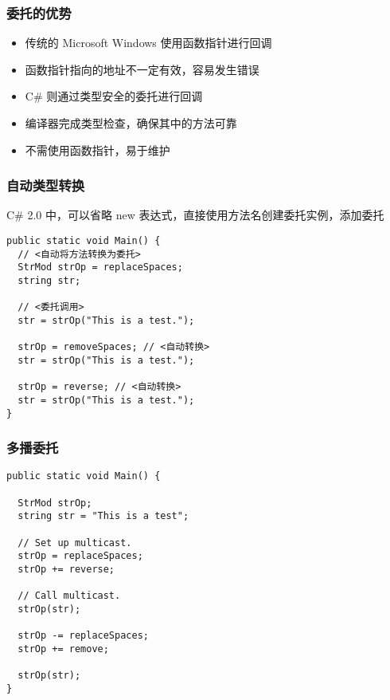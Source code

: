 \begin{frame}
\frametitle{委托的优势}

\begin{itemize}
\setlength{\itemsep}{6pt plus 1pt}
\item 传统的 Microsoft Windows 使用函数指针进行回调
\item 函数指针指向的地址不一定有效，容易发生错误
\item C\# 则通过类型安全的委托进行回调
\item 编译器完成类型检查，确保其中的方法可靠
\item 不需使用函数指针，易于维护
\end{itemize}

\end{frame}

\begin{frame}[fragile]
\frametitle{自动类型转换}
\CJKindent C\# 2.0 中，可以省略 new 表达式，直接使用方法名创建委托实例，添加委托
\begin{lstlisting}[escapeinside=<>]
public static void Main() {
  // <自动将方法转换为委托>
  StrMod strOp = replaceSpaces;
  string str;

  // <委托调用>
  str = strOp("This is a test.");

  strOp = removeSpaces; // <自动转换>
  str = strOp("This is a test.");

  strOp = reverse; // <自动转换>
  str = strOp("This is a test.");
}
\end{lstlisting}
\end{frame}


\begin{frame}[fragile]
\frametitle{多播委托}
\begin{lstlisting}
public static void Main() {

  StrMod strOp;
  string str = "This is a test";

  // Set up multicast.
  strOp = replaceSpaces;
  strOp += reverse;

  // Call multicast.
  strOp(str);

  strOp -= replaceSpaces;
  strOp += remove;

  strOp(str);
}
\end{lstlisting}
\end{frame}


